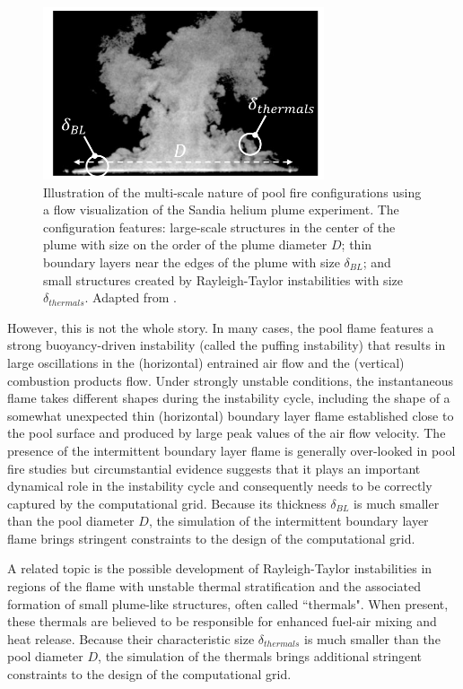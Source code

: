 \begin{figure}
\centering
\includegraphics[height=2in]{Figures/He-Plume-Scales.png}
\caption{Illustration of the multi-scale nature of pool fire configurations using a flow visualization of the Sandia helium plume experiment. The configuration features: large-scale structures in the center of the plume with size on the order of the plume diameter $D$; thin boundary layers near the edges of the plume with size $\delta_{BL}$; and small structures created by Rayleigh-Taylor instabilities with size $\delta_{thermals}$. Adapted from \cite{Case1_EXP}.}
\label{fig:He-Plume-Scales}
\end{figure}

However, this is not the whole story. In many cases, the pool flame features a strong buoyancy-driven instability (called the puffing instability) that results in large oscillations in the (horizontal) entrained air flow and the (vertical) combustion products flow. Under strongly unstable conditions, the instantaneous flame takes different shapes during the instability cycle, including the shape of a somewhat unexpected thin (horizontal) boundary layer flame established close to the pool surface and produced by large peak values of the air flow velocity. The presence of the intermittent boundary layer flame is generally over-looked in pool fire studies but circumstantial evidence suggests that it plays an important dynamical role in the instability cycle and consequently needs to be correctly captured by the computational grid. Because its thickness $\delta_{BL}$ is much smaller than the pool diameter $D$, the simulation of the intermittent boundary layer flame brings stringent constraints to the design of the computational grid.

A related topic is the possible development of Rayleigh-Taylor instabilities in regions of the flame with unstable thermal stratification and the associated formation of small plume-like structures, often called ``thermals". When present, these thermals are believed to be responsible for enhanced fuel-air mixing and heat release. Because their characteristic size $\delta_{thermals}$ is much smaller than the pool diameter $D$, the simulation of the thermals brings additional stringent constraints to the design of the computational grid.

